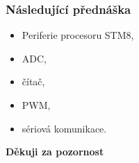   \begin{frame}
    \frametitle{Následující přednáška}
		
		\begin{itemize}
			\item Periferie procesoru STM8,
			\item ADC,
			\item čítač,
			\item PWM,
			\item sériová komunikace.
		\end{itemize}
		
		\begin{center}
			\textbf{Děkuji za pozornost}
		\end{center}
		
	\end{frame}